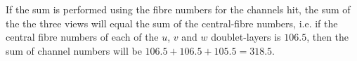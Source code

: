 If the sum is performed using the fibre numbers for the channels hit,
the sum of the the three views will equal the sum of the
central-fibre numbers, i.e. if the central fibre numbers of each of
the $u$, $v$ and $w$ doublet-layers is $106.5$, then the sum of
channel numbers will be $106.5+106.5+105.5 = 318.5$. 
